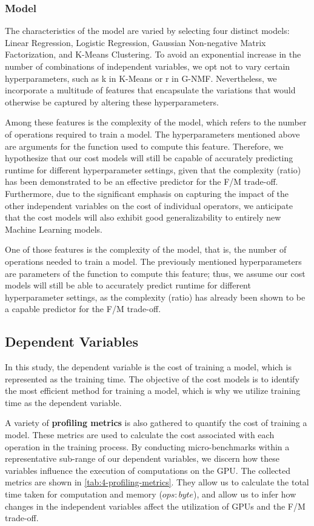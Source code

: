 \subsubsection{Model}
The characteristics of the model are varied by selecting four distinct models: Linear Regression, Logistic Regression, Gaussian Non-negative Matrix Factorization, and K-Means Clustering. To avoid an exponential increase in the number of combinations of independent variables, we opt not to vary certain hyperparameters, such as k in K-Means or r in G-NMF. Nevertheless, we incorporate a multitude of features that encapsulate the variations that would otherwise be captured by altering these hyperparameters.

Among these features is the complexity of the model, which refers to the number of operations required to train a model. The hyperparameters mentioned above are arguments for the function used to compute this feature. Therefore, we hypothesize that our cost models will still be capable of accurately predicting runtime for different hyperparameter settings, given that the complexity (ratio) has been demonstrated to be an effective predictor for the F/M trade-off. Furthermore, due to the significant emphasis on capturing the impact of the other independent variables on the cost of individual operators, we anticipate that the cost models will also exhibit good generalizability to entirely new Machine Learning models.

One of those features is the complexity of the model, that is, the number of operations needed to train a model. The previously mentioned hyperparameters are parameters of the function to compute this feature; thus, we assume our cost models will still be able to accurately predict runtime for different hyperparameter settings, as the complexity (ratio) has already been shown to be a capable predictor for the F/M trade-off.

\subsection{Dependent Variables}
In this study, the dependent variable is the cost of training a model, which is represented as the training time. The objective of the cost models is to identify the most efficient method for training a model, which is why we utilize training time as the dependent variable.

A variety of \textbf{profiling metrics} is also gathered to quantify the cost of training a model. These metrics are used to calculate the cost associated with each operation in the training process. By conducting micro-benchmarks within a representative sub-range of our dependent variables, we discern how these variables influence the execution of computations on the GPU. The collected metrics are shown in \autoref{tab:4-profiling-metrics}. They allow us to calculate the total time taken for computation and memory ($ops:byte$), and allow us to infer how changes in the independent variables affect the utilization of GPUs and the F/M trade-off.



